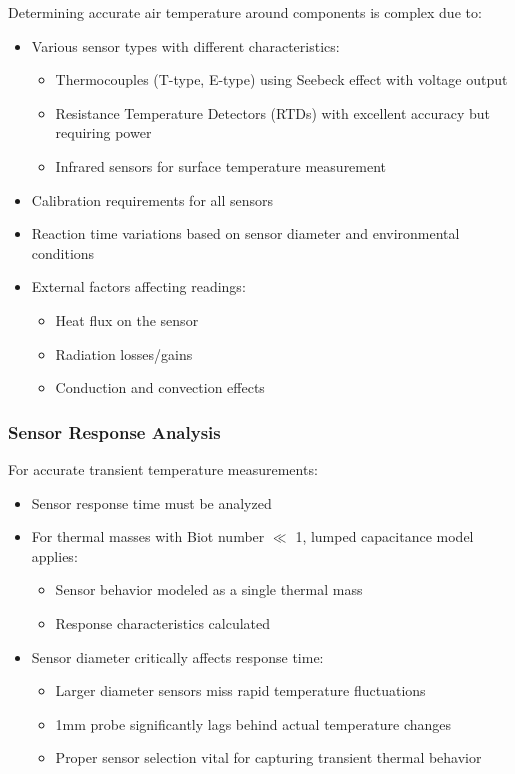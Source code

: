 Determining accurate air temperature around components is complex due to:
\begin{itemize}
    \item Various sensor types with different characteristics:
    \begin{itemize}
        \item Thermocouples (T-type, E-type) using Seebeck effect with voltage output
        \item Resistance Temperature Detectors (RTDs) with excellent accuracy but requiring power
        \item Infrared sensors for surface temperature measurement
    \end{itemize}
    \item Calibration requirements for all sensors
    \item Reaction time variations based on sensor diameter and environmental conditions
    \item External factors affecting readings:
    \begin{itemize}
        \item Heat flux on the sensor
        \item Radiation losses/gains
        \item Conduction and convection effects
    \end{itemize}
\end{itemize}

\subsubsection*{Sensor Response Analysis}

For accurate transient temperature measurements:
\begin{itemize}
    \item Sensor response time must be analyzed
    \item For thermal masses with Biot number $\ll$ 1, lumped capacitance model applies:
    \begin{itemize}
        \item Sensor behavior modeled as a single thermal mass
        \item Response characteristics calculated
    \end{itemize}
    \item Sensor diameter critically affects response time:
    \begin{itemize}
        \item Larger diameter sensors miss rapid temperature fluctuations
        \item 1mm probe significantly lags behind actual temperature changes
        \item Proper sensor selection vital for capturing transient thermal behavior
    \end{itemize}
\end{itemize}

